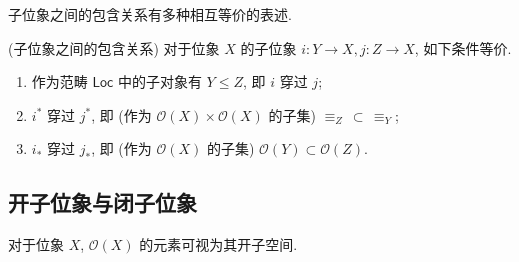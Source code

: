 子位象之间的包含关系有多种相互等价的表述.

\begin{prop}
	{(子位象之间的包含关系)}
	对于位象 $X$ 的子位象 $i\colon Y\to X,j\colon Z\to X$, 如下条件等价.
	\begin{enumerate}[(1)]
		\item 作为范畴 $\mathsf {Loc}$ 中的子对象有 $Y\leq Z$, 即 $i$ 穿过 $j$;
		\item $i^*$ 穿过 $j^*$, 即 (作为 $\mathcal O(X)\times\mathcal O(X)$ 的子集) $\equiv_Z \,\subset\, \equiv_Y$;
		\item $i_*$ 穿过 $j_*$, 即 (作为 $\mathcal O(X)$ 的子集) $\mathcal O(Y) \subset \mathcal O(Z)$.
	\end{enumerate}
\end{prop}

\subsection{开子位象与闭子位象}

对于位象 $X$, $\mathcal O(X)$ 的元素可视为其开子空间.

